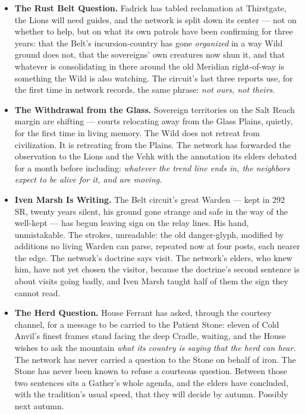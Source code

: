 \begin{itemize}
    \item \textbf{The Rust Belt Question.} Fadrick has tabled reclamation at Thirstgate, the Lions will need guides, and the network is split down its center --- not on whether to help, but on what its own patrols have been confirming for three years: that the Belt's incursion-country has gone \textit{organized} in a way Wild ground does not, that the sovereigns' own creatures now shun it, and that whatever is consolidating in there around the old Meridian right-of-way is something the Wild is also watching. The circuit's last three reports use, for the first time in network records, the same phrase: \textit{not ours, not theirs.}
    \item \textbf{The Withdrawal from the Glass.} Sovereign territories on the Salt Reach margin are shifting --- courts relocating away from the Glass Plains, quietly, for the first time in living memory. The Wild does not retreat from civilization. It is retreating from the Plains. The network has forwarded the observation to the Lions and the Vehk with the annotation its elders debated for a month before including: \textit{whatever the trend line ends in, the neighbors expect to be alive for it, and are moving.}
    \item \textbf{Iven Marsh Is Writing.} The Belt circuit's great Warden --- kept in 292 SR, twenty years silent, his ground gone strange and safe in the way of the well-kept --- has begun leaving sign on the relay lines. His hand, unmistakable. The strokes, unreadable: the old danger-glyph, modified by additions no living Warden can parse, repeated now at four posts, each nearer the edge. The network's doctrine says visit. The network's elders, who knew him, have not yet chosen the visitor, because the doctrine's second sentence is about visits going badly, and Iven Marsh taught half of them the sign they cannot read.
    \item \textbf{The Herd Question.} House Ferrant has asked, through the courtesy channel, for a message to be carried to the Patient Stone: eleven of Cold Anvil's finest frames stand facing the deep Cradle, waiting, and the House wishes to ask the mountain \textit{what its country is saying that the herd can hear.} The network has never carried a question to the Stone on behalf of iron. The Stone has never been known to refuse a courteous question. Between those two sentences sits a Gather's whole agenda, and the elders have concluded, with the tradition's usual speed, that they will decide by autumn. Possibly next autumn.

\end{itemize}
